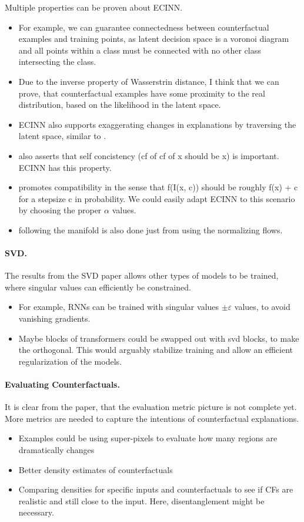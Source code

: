\documentclass[11pt,a4paper,twoside,openright,final]{memoir}
\begin{document}
Multiple properties can be proven about ECINN.
\begin{itemize}
    \item For example, we can guarantee connectedness between counterfactual examples and training points, as latent decision space is a voronoi diagram and all points within a class must be connected with no other class intersecting the class.
    \item Due to the inverse property of Wasserstrin distance, I think that we can prove, that counterfactual examples have some proximity to the real distribution, based on the likelihood in the latent space.
    \item ECINN also supports exaggerating changes in explanations by traversing the latent space, similar to \cite{Singla2019}. 
    \item \cite{Singla2019} also asserts that self concistency (cf of cf of x should be x) is important. ECINN has this property.
    \item \cite{Singla2019} promotes compatibility in the sense that f(I(x, c)) should be roughly f(x) + c for a stepsize c in probability. We could easily adapt ECINN to this scenario by choosing the proper $\alpha$ values.
    \item \cite{Singla2019} following the manifold is also done just from using the normalizing flows.
\end{itemize}

\paragraph{SVD.}
The results from the SVD paper allows other types of models to be trained, where singular values can efficiently be constrained.
\begin{itemize}
    \item For example, RNNs can be trained with singular values $\pm \varepsilon$ values, to avoid vanishing gradients.
    \item Maybe blocks of transformers could be swapped out with svd blocks, to make the orthogonal. This would arguably stabilize training and allow an efficient regularization of the models.
\end{itemize}


\paragraph{Evaluating Counterfactuals.}
It is clear from the paper, that the evaluation metric picture is not complete yet.
More metrics are needed to capture the intentions of counterfactual explanations.
\begin{itemize}
    \item Examples could be using super-pixels to evaluate how many regions are dramatically changes
    \item Better density estimates of counterfactuals
    \item Comparing densities for specific inputs and counterfactuals to see if CFs are realistic and still close to the input. Here, disentanglement might be necessary.
\end{itemize}
\end{document}
